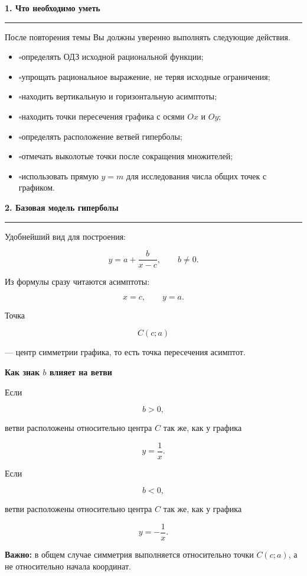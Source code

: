 \documentclass[a4paper,12pt]{article}
\newcommand{\sectiontitle}[1]{%
    \par\vspace{0.65em}
    {\Large\bfseries\color{darkaccent}#1}\par
    \vspace{0.15em}
    {\color{accent}\rule{\linewidth}{0.65pt}}\par
    \vspace{0.3em}
}
\newcommand{\subsectiontitle}[1]{%
    \par\vspace{0.45em}
    {\large\bfseries\color{darkaccent}#1}\par
    \vspace{0.1em}
}
\newcommand{\checkitem}{\(\square\)\;}
\begin{document}
\clearpage

\sectiontitle{1. Что необходимо уметь}

После повторения темы Вы должны уверенно выполнять следующие действия.

\begin{itemize}
    \item \checkitem определять ОДЗ исходной рациональной функции;
    \item \checkitem упрощать рациональное выражение, не теряя исходные ограничения;
    \item \checkitem находить вертикальную и горизонтальную асимптоты;
    \item \checkitem находить точки пересечения графика с осями \(Ox\) и \(Oy\);
    \item \checkitem определять расположение ветвей гиперболы;
    \item \checkitem отмечать выколотые точки после сокращения множителей;
    \item \checkitem использовать прямую \(y=m\) для исследования числа общих точек с графиком.
\end{itemize}

\sectiontitle{2. Базовая модель гиперболы}

Удобнейший вид для построения:

\[
\boxed{y=a+\frac{b}{x-c}},
\qquad b\ne0.
\]

Из формулы сразу читаются асимптоты:

\[
\boxed{x=c},
\qquad
\boxed{y=a}.
\]

Точка

\[
\boxed{C(c;a)}
\]

--- центр симметрии графика, то есть точка пересечения асимптот.

\subsectiontitle{Как знак \(b\) влияет на ветви}

Если

\[
b>0,
\]

ветви расположены относительно центра \(C\) так же, как у графика

\[
y=\frac1x.
\]

Если

\[
b<0,
\]

ветви расположены относительно центра \(C\) так же, как у графика

\[
y=-\frac1x.
\]

\textbf{Важно:} в общем случае симметрия выполняется относительно точки
\(C(c;a)\), а не относительно начала координат.
\end{document}
